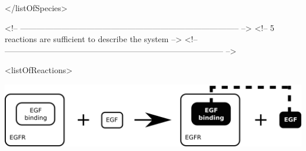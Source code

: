 \begin{example}
    </listOfSpecies>

<!-- -------------------------------------------------------------------------------- -->
<!-- 5 reactions are sufficient to describe the system                                -->
<!-- -------------------------------------------------------------------------------- -->

    <listOfReactions>
\end{example}

\includegraphics[scale=0.9]{figs/pngs/EGFbinding.png}

